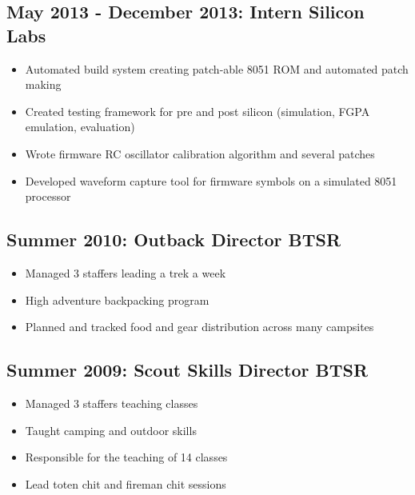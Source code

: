 \documentclass[letterpaper,12pt]{resume}
\begin{document}
\subsection{May 2013 - December 2013: Intern Silicon Labs}
\begin{itemize}
  \item
    Automated build system creating patch-able 8051 ROM and automated patch making
  \item
    Created testing framework for pre and post silicon (simulation, FGPA emulation, evaluation)
  \item
    Wrote firmware RC oscillator calibration algorithm and several patches
  \item
    Developed waveform capture tool for firmware symbols on a simulated 8051 processor
\end{itemize}

\subsection{Summer 2010: Outback Director BTSR}
\begin{itemize}
  \item
    Managed 3 staffers leading a trek a week
  \item
    High adventure backpacking program
  \item
    Planned and tracked food and gear distribution across many campsites
\end{itemize}

\subsection{Summer 2009: Scout Skills Director BTSR}
\begin{itemize}
  \item
    Managed 3 staffers teaching classes
  \item
    Taught camping and outdoor skills
  \item
    Responsible for the teaching of 14 classes
  \item
    Lead toten chit and fireman chit sessions
\end{itemize}
\end{document}
